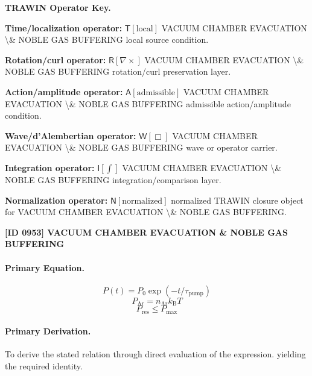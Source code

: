 \par\vspace{0.45\baselineskip}
\noindent\begin{minipage}[t]{\linewidth}
\begingroup
\small
\raggedright
\textbf{TRAWIN Operator Key.}\par
\noindent\textbf{Time/localization operator:} $\mathsf{T}\!\left[\mathrm{local}\right]$ VACUUM CHAMBER EVACUATION \textbackslash{}\& NOBLE GAS BUFFERING local source condition.\par
\noindent\textbf{Rotation/curl operator:} $\mathsf{R}\!\left[\nabla\times\right]$ VACUUM CHAMBER EVACUATION \textbackslash{}\& NOBLE GAS BUFFERING rotation/curl preservation layer.\par
\noindent\textbf{Action/amplitude operator:} $\mathsf{A}\!\left[\mathrm{admissible}\right]$ VACUUM CHAMBER EVACUATION \textbackslash{}\& NOBLE GAS BUFFERING admissible action/amplitude condition.\par
\noindent\textbf{Wave/d'Alembertian operator:} $\mathsf{W}\!\left[\Box\right]$ VACUUM CHAMBER EVACUATION \textbackslash{}\& NOBLE GAS BUFFERING wave or operator carrier.\par
\noindent\textbf{Integration operator:} $\mathsf{I}\!\left[\int\right]$ VACUUM CHAMBER EVACUATION \textbackslash{}\& NOBLE GAS BUFFERING integration/comparison layer.\par
\noindent\textbf{Normalization operator:} $\mathsf{N}\!\left[\mathrm{normalized}\right]$ normalized TRAWIN closure object for VACUUM CHAMBER EVACUATION \textbackslash{}\& NOBLE GAS BUFFERING.\par
\endgroup
\end{minipage}

\clearpage
\noindent\textbf{[ID 0953] VACUUM CHAMBER EVACUATION \& NOBLE GAS BUFFERING}\par
\vspace{0.35em}
\paragraph{Primary Equation.}
\[
P(t)=P_0\exp(-t/\tau_{\mathrm{pump}})
\]
\[
P_{\mathrm{Ar}}=n_{\mathrm{Ar}}k_{\mathrm{B}}T
\]
\[
P_{\mathrm{res}}\leq P_{\mathrm{max}}
\]

\paragraph{Primary Derivation.}
To derive the stated relation through direct evaluation of the expression. yielding the required identity.
